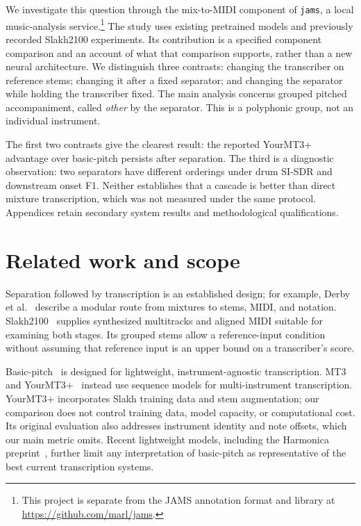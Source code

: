 \documentclass[11pt]{article}
\newcommand{\jams}{\texttt{jams}}
\begin{document}
We investigate this question through the mix-to-MIDI component of \jams{}, a local
music-analysis service.\footnote{This project is separate from the JAMS annotation
format and library at \url{https://github.com/marl/jams}.} The study uses existing pretrained models and previously
recorded Slakh2100 experiments. Its contribution is a specified component comparison
and an account of what that comparison supports, rather than a new neural
architecture. We distinguish three contrasts: changing the transcriber on reference
stems; changing it after a fixed separator; and changing the separator while holding
the transcriber fixed. The main analysis concerns grouped pitched accompaniment,
called \emph{other} by the separator. This is a polyphonic group, not an individual
instrument.

The first two contrasts give the clearest result: the reported YourMT3+ advantage
over basic-pitch persists after separation. The third is a diagnostic observation:
two separators have different orderings under drum SI-SDR and downstream onset F1.
Neither establishes that a cascade is better than direct mixture transcription,
which was not measured under the same protocol. Appendices retain secondary system
results and methodological qualifications.

\section{Related work and scope}
Separation followed by transcription is an established design; for example,
Derby et al.~\citep{derby2024pipeline} describe a modular route from mixtures to
stems, MIDI, and notation. Slakh2100~\citep{manilow2019slakh} supplies synthesized
multitracks and aligned MIDI suitable for examining both stages. Its grouped stems
allow a reference-input condition without assuming that reference input is an
upper bound on a transcriber's score.

Basic-pitch~\citep{bittner2022basicpitch} is designed for lightweight,
instrument-agnostic transcription. MT3~\citep{gardner2022mt3} and
YourMT3+~\citep{chang2024yourmt3} instead use sequence models for multi-instrument
transcription. YourMT3+ incorporates Slakh training data and stem augmentation;
our comparison does not control training data, model capacity, or computational
cost. Its original evaluation also addresses instrument identity and note offsets,
which our main metric omits. Recent lightweight models, including the Harmonica
preprint~\citep{ou2026harmonica}, further limit any interpretation of basic-pitch
as representative of the best current transcription systems.
\end{document}
